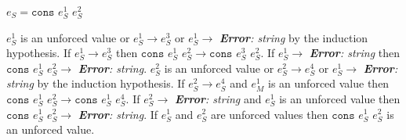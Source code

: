 \begin{case}

$e_{S}=\mathtt{cons}$ $e_{S}^{1}$ $e_{S}^{2}$

$e_{S}^{1}$ is an unforced value or $e_{S}^{1}\rightarrow e_{S}^{3}$ or $e_{S}^{1}\rightarrow$ \emph{\textbf{Error}: string} by the induction hypothesis.  If $e_{S}^{1}\rightarrow e_{S}^{3}$ then $\mathtt{cons}$ $e_{S}^{1}$ $e_{S}^{2}\rightarrow\mathtt{cons}$ $e_{S}^{3}$ $e_{S}^{2}$.  If $e_{S}^{1}\rightarrow$ \emph{\textbf{Error}: string} then $\mathtt{cons}$ $e_{S}^{1}$ $e_{S}^{2}\rightarrow$ \emph{\textbf{Error}: string}.  $e_{S}^{2}$ is an unforced value or $e_{S}^{2}\rightarrow e_{S}^{4}$ or $e_{S}^{1}\rightarrow$ \emph{\textbf{Error}: string} by the induction hypothesis.  If $e_{S}^{2}\rightarrow e_{S}^{4}$ and $e_{M}^{1}$ is an unforced value then $\mathtt{cons}$ $e_{S}^{1}$ $e_{S}^{2}\rightarrow\mathtt{cons}$ $e_{S}^{1}$ $e_{S}^{4}$.  If $e_{S}^{2}\rightarrow$ \emph{\textbf{Error}: string} and $e_{S}^{1}$ is an unforced value then $\mathtt{cons}$ $e_{S}^{1}$ $e_{S}^{2}\rightarrow$ \emph{\textbf{Error}: string}.  If $e_{S}^{1}$ and $e_{S}^{2}$ are unforced values then $\mathtt{cons}$ $e_{S}^{1}$ $e_{S}^{2}$ is an unforced value.

\end{case}